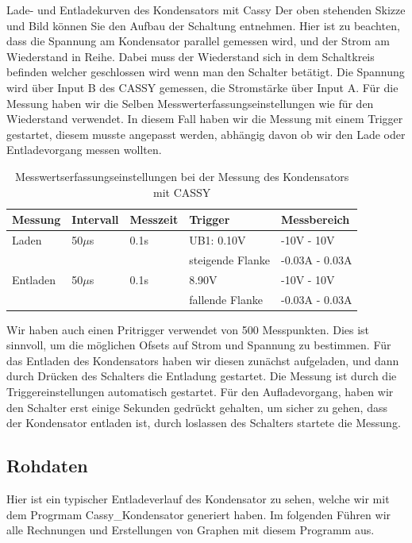 \documentclass[twoside]{protokoll}
\begin{document}
\begin{aufgabe}{Lade- und Entladekurven des Kondensators mit Cassy}
 Der oben stehenden Skizze und Bild können Sie den Aufbau der Schaltung entnehmen. Hier ist zu beachten, dass die Spannung am Kondensator parallel gemessen wird, und der Strom am Wiederstand in Reihe. 
 Dabei muss der Wiederstand sich in dem Schaltkreis befinden welcher geschlossen wird wenn man den Schalter betätigt. 
 Die Spannung wird über Input B des CASSY gemessen, die Stromstärke über Input A. Für die Messung haben wir die Selben Messwerterfassungseinstellungen wie für den Wiederstand verwendet. 
 In diesem Fall haben wir die Messung mit einem Trigger gestartet, diesem musste angepasst werden, abhängig davon ob wir den Lade oder Entladevorgang messen wollten.
 
 \begin{table}[H]
        \centering
        \begin{tabularx}{1\textwidth}{X X X l l} %
            \toprule
            \textbf{Messung} & \textbf{Intervall} & \textbf{Messzeit} & \textbf{Trigger} & \textbf{Messbereich} \\
            \midrule
            Laden & 50$\mu$s  & 0.1s & UB1: 0.10V & -10V - 10V \\
            & & & steigende Flanke & -0.03A - 0.03A\\
            Entladen & 50$\mu$s  & 0.1s & 8.90V & -10V - 10V \\
            & & & fallende Flanke & -0.03A - 0.03A\\
            \bottomrule
        \end{tabularx}
        \caption{Messwertserfassungseinstellungen bei der Messung des Kondensators mit CASSY}
        \label{tab:mytable}
    \end{table}

Wir haben auch einen Pritrigger verwendet von 500 Messpunkten. Dies ist sinnvoll, um die möglichen Ofsets auf Strom und Spannung zu bestimmen.
Für das Entladen des Kondensators haben wir diesen zunächst aufgeladen, und dann durch Drücken des Schalters die Entladung gestartet. 
Die Messung ist durch die Triggereinstellungen automatisch gestartet.
Für den Aufladevorgang, haben wir den Schalter erst einige Sekunden gedrückt gehalten, um sicher zu gehen, dass der Kondensator entladen ist, durch loslassen des Schalters startete die Messung.

 
\subsection{Rohdaten}
Hier ist ein typischer Entladeverlauf des Kondensator zu sehen, welche wir mit dem Progrmam Cassy\_Kondensator generiert haben.
Im folgenden Führen wir alle Rechnungen und Erstellungen von Graphen mit diesem Programm aus.\\


\end{aufgabe}
\end{document}
